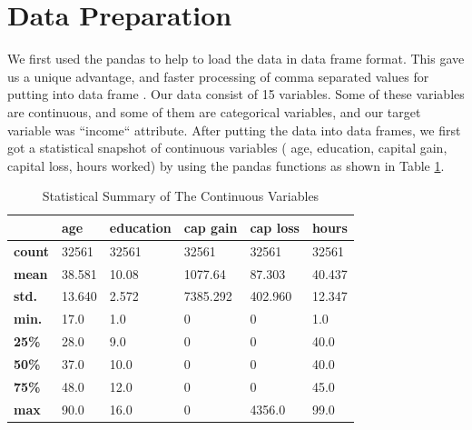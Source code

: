 \documentclass[sigconf]{acmart}
\begin{document}

\section{Data Preparation}

We first used the pandas \cite{www-pandas} to help to load the data in data frame format. This gave us a unique advantage, and faster processing of comma separated values for putting into data frame \cite{www-commasep}.  Our data consist of 15 variables. Some of these variables are continuous, and some of them are categorical variables, and our target variable was ``income`` attribute. After putting the data into data frames, we first got a statistical snapshot of continuous variables ( age, education, capital gain, capital loss, hours worked) by using the pandas \cite{www-pandas.describe} functions as shown in Table \ref{stats-table}. 

\begin{table}[!ht]
\centering
\begin{tabular}{|l|l|l|l|l|l|}
\hline
               & \textbf{age} & \textbf{education} & \textbf{cap gain} & \textbf{cap loss} & \textbf{hours} \\ \hline
\textbf{count} & 32561        & 32561              & 32561             & 32561             & 32561          \\ \hline
\textbf{mean}  & 38.581       & 10.08              & 1077.64           & 87.303            & 40.437         \\ \hline
\textbf{std.}  & 13.640       & 2.572              & 7385.292          & 402.960           & 12.347         \\ \hline
\textbf{min.}  & 17.0         & 1.0                & 0                 & 0                 & 1.0            \\ \hline
\textbf{25\%}  & 28.0         & 9.0                & 0                 & 0                 & 40.0           \\ \hline
\textbf{50\%}  & 37.0         & 10.0               & 0                 & 0                 & 40.0           \\ \hline
\textbf{75\%}  & 48.0         & 12.0               & 0                 & 0                 & 45.0           \\ \hline
\textbf{max}   & 90.0         & 16.0               & 0                 & 4356.0            & 99.0           \\ \hline
\end{tabular}
\caption{Statistical Summary of The Continuous Variables}
\label{stats-table}
\end{table}
\end{document}
